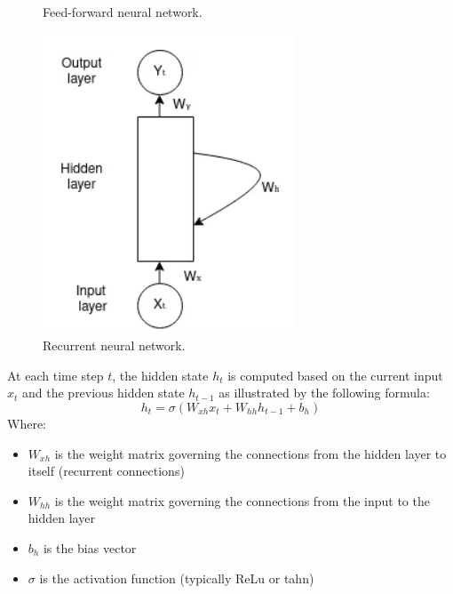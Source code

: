 \begin{figure}[H]
\begin{minipage}{0.3168\textwidth}
        \caption{Feed-forward neural network.}
        \label{fig:image1}
    \end{minipage}%
    \hfill
    \begin{minipage}{0.418\textwidth}
        \centering
        \includegraphics[width=\textwidth]{Machine_learning_thesis/Images/Recurrent Neural Network.png}
        \caption{Recurrent neural network.}
        \label{fig:image2}
    \end{minipage}
\end{figure}
At each time step $t$, the hidden state $h_t$ is computed based on the current input $x_t$ and the previous hidden state $h_{t-1}$ as illustrated by the following formula:
\[
h_t = \sigma\left(W_{xh} x_t + W_{hh} h_{t-1} + b_h\right)
\]
Where: 
\begin{itemize}
    \item $W_{xh}$ is the weight matrix governing the connections from the hidden layer to itself (recurrent connections)
    \item $W_{hh}$ is the weight matrix governing the connections from the input to the hidden layer
    \item $b_h$ is the bias vector
    \item $\sigma$ is the activation function (typically ReLu or tahn)
\end{itemize}
